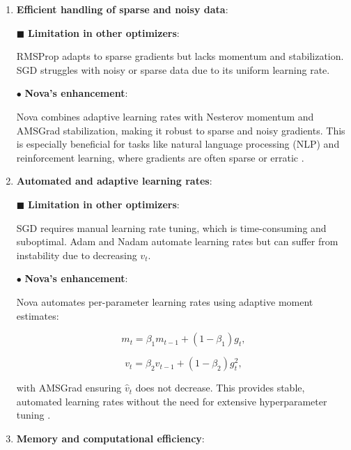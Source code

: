 \documentclass{article}
\begin{document}
\begin{enumerate}
$\bullet$ \textbf{Nova’s enhancement}:

Nova employs Decoupled Weight Decay (akin to AdamW \cite{Loshchilov2017}), applying regularization separately:


\[
\theta_{t+1} = \theta_t - \eta \left( \frac{\hat{m}_t}{\sqrt{\hat{v}_t} + \epsilon} + \lambda \theta_t \right),
\]


where $\lambda \theta_t$ is the weight decay term. This separation improves generalization, particularly in large-scale networks, by preventing overfitting \cite{Zhang2021}.

\item {\bf Efficient handling of sparse and noisy data}:

$\blacksquare$ \textbf{Limitation in other optimizers}:

RMSProp adapts to sparse gradients but lacks momentum and stabilization. SGD struggles with noisy or sparse data due to its uniform learning rate.

$\bullet$ \textbf{Nova’s enhancement}:

Nova combines adaptive learning rates with Nesterov momentum and AMSGrad stabilization, making it robust to sparse and noisy gradients. This is especially beneficial for tasks like natural language processing (NLP) and reinforcement learning, where gradients are often sparse or erratic \cite{Johnson2020}.

\item {\bf Automated and adaptive learning rates}:

$\blacksquare$ \textbf{Limitation in other optimizers}:

SGD requires manual learning rate tuning, which is time-consuming and suboptimal. Adam and Nadam automate learning rates but can suffer from instability due to decreasing $v_t$.

$\bullet$ \textbf{Nova’s enhancement}:

Nova automates per-parameter learning rates using adaptive moment estimates:


\[
m_t = \beta_1 m_{t-1} + (1 - \beta_1) g_t,
\]




\[
v_t = \beta_2 v_{t-1} + (1 - \beta_2) g_t^2,
\]


with AMSGrad ensuring $\hat{v}_t$ does not decrease. This provides stable, automated learning rates without the need for extensive hyperparameter tuning \cite{Choi2019}.

\item{\bf Memory and computational efficiency}:


\end{enumerate}
\end{document}
